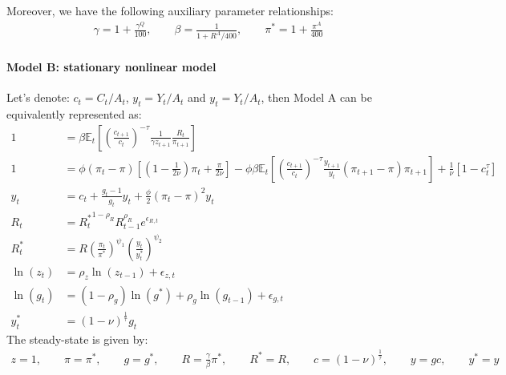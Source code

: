 Moreover, we have the following auxiliary parameter relationships:
\begin{align*}
\gamma = 1+\frac{\gamma^{Q}}{100}, \qquad
\beta = \frac{1}{1+R^{A}/400}, \qquad
\pi^* = 1+\frac{\pi^{A}}{400}
\end{align*}

\paragraph{Model B: stationary nonlinear model}
Let's denote: $c_t= C_t/A_t$, $y_t= Y_t/A_t$ and $y_t= Y_t/A_t$, then Model A can be equivalently represented as:
\begin{align}
1 &= \beta \mathbb{E}_t\left[\left(\frac{c_{t+1}}{c_t}\right)^{-\tau} \frac{1}{\gamma z_{t+1}} \frac{R_t}{\pi_{t+1}}\right] \label{eq:AS_B1}
\\
1 &= \phi \left(\pi_t - \pi\right) \left[\left(1-\frac{1}{2\nu}\right)\pi_t + \frac{\pi}{2\nu}\right] - \phi \beta \mathbb{E}_t \left[\left(\frac{c_{t+1}}{c_t}\right)^{-\tau} \frac{y_{t+1}}{y_t} \left(\pi_{t+1} - \pi \right) \pi_{t+1}\right] + \frac{1}{\nu}\left[1-c_t^{\tau}\right]
\\
y_t &= c_t + \frac{g_t-1}{g_t} y_t + \frac{\phi}{2} \left({\pi_t - \pi}\right)^2 y_t
\\
R_t &= {R_t^{*}}^{1-\rho_R} R_{t-1}^{\rho_R} e^{\epsilon_{R,t}}
\\
R_t^* & = R \left(\frac{\pi_t}{\pi^*}\right)^{\psi_1} \left(\frac{y_t}{y_t^*}\right)^{\psi_2}
\\
\ln(z_t) &= \rho_z \ln(z_{t-1}) + \epsilon_{z,t}
\\
\ln(g_t) &= (1-\rho_g)\ln(g^*) + \rho_g \ln(g_{t-1}) + \epsilon_{g,t}
\\
y_t^* &= (1-\nu)^{\frac{1}{\tau}} g_t
\end{align}
The steady-state is given by:
\begin{align*}
z=1, \qquad\pi = \pi^*, \qquad g=g^*, \qquad R=\frac{\gamma}{\beta}\pi^*, \qquad R^* = R, \qquad c = (1-\nu)^{\frac{1}{\tau}}, \qquad y = gc , \qquad y^*=y
\end{align*}

